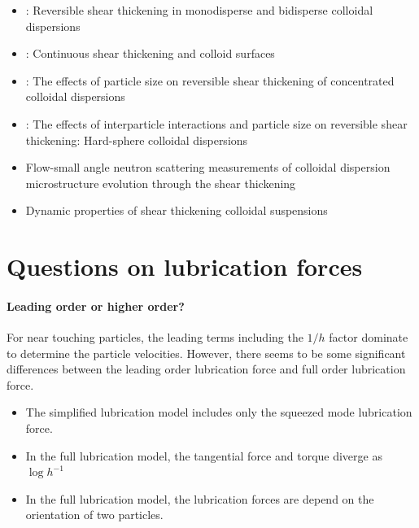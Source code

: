 \documentclass[11pt]{scrartcl}
\begin{document}
\begin{itemize}
 \item \citet{Bender_1996}:
Reversible shear thickening in monodisperse and bidisperse colloidal dispersions
 \item \citet{Melrose_1996}:
Continuous shear thickening and colloid surfaces
 \item \citet{Maranzano_2001}:
The effects of particle size on reversible shear thickening of concentrated colloidal dispersions
 \item \citet{Maranzano_2001a}:
The effects of interparticle interactions and particle size 
on reversible shear thickening: Hard-sphere colloidal dispersions
 \item \citet{Maranzano_2002}
Flow-small angle neutron scattering measurements 
of colloidal dispersion microstructure evolution through the shear thickening 
 \item \cite{Lee_2003}
Dynamic properties of shear thickening colloidal suspensions

 \end{itemize}

\section{Questions on lubrication forces}


\paragraph{Leading order or higher order?}

For near touching particles,
the leading terms including the $1/h$ factor
dominate to determine the particle velocities.
%
However, there seems
to be some significant differences
between the leading order lubrication force 
and full order lubrication force.

\begin{itemize}
  \item The simplified lubrication model
  includes only the squeezed mode lubrication force.
  \item 
  In the full lubrication model,
  the tangential force and torque
  diverge as $\log h^{-1}$
  \item 
  In the full lubrication model,
  the lubrication forces are depend on
  the orientation of two particles.
\end{itemize}
\end{document}
